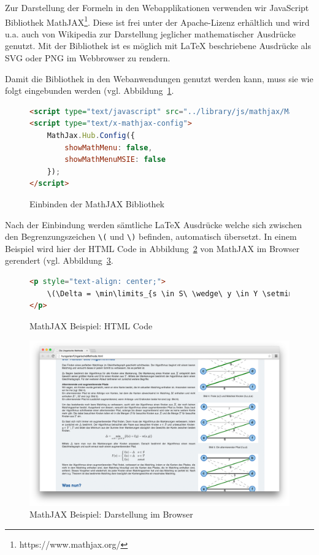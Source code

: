 Zur Darstellung der Formeln in den Webapplikationen verwenden wir JavaScript Bibliothek MathJAX\footnote{https://www.mathjax.org/}. Diese ist frei unter der Apache-Lizenz erhältlich und wird u.a. auch von Wikipedia zur Darstellung jeglicher mathematischer Ausdrücke genutzt. Mit der Bibliothek ist es möglich mit LaTeX beschriebene Ausdrücke als SVG oder PNG im Webbrowser zu rendern. 

Damit die Bibliothek in den Webanwendungen genutzt werden kann, muss sie wie folgt eingebunden werden (vgl. Abbildung~\ref{fig:listing-mathjax-include}.

\begin{figure}[h!]
\begin{lstlisting}[language=HTML]
<script type="text/javascript" src="../library/js/mathjax/MathJax.js?config=TeX-AMS-MML_SVG.js&locale=de"></script>
<script type="text/x-mathjax-config">
	MathJax.Hub.Config({
		showMathMenu: false,
		showMathMenuMSIE: false
	});
</script>
\end{lstlisting}
\caption[MathJAX Einbindung]{Einbinden der MathJAX Bibliothek}\label{fig:listing-mathjax-include}
\end{figure}

Nach der Einbindung werden sämtliche LaTeX Ausdrücke welche sich zwischen den Begrenzungszeichen \texttt{\textbackslash(} und \texttt{\textbackslash)} befinden, automatisch übersetzt. In einem Beispiel wird hier der HTML Code in Abbildung~\ref{fig:listing-mathjax-example-html} von MathJAX im Browser gerendert (vgl. Abbildung~\ref{fig:mathjax-example-img}.

\begin{figure}[h!]
\begin{lstlisting}[language=HTML]
<p style="text-align: center;">
	\(\Delta = \min\limits_{s \in S\ \wedge\ y \in Y \setminus T}\{l(s) + l(y) - w(s,y)\}\)
</p>
\end{lstlisting}
\caption[MathJAX Beispiel]{MathJAX Beispiel: HTML Code}\label{fig:listing-mathjax-example-html}
\end{figure}

\begin{figure}[h!]
	\centering
	\includegraphics[width=\textwidth]{figures/mathjax-example}
	\caption[MathJAX Beispiel]{MathJAX Beispiel: Darstellung im Browser}\label{fig:mathjax-example-img}
\end{figure}

